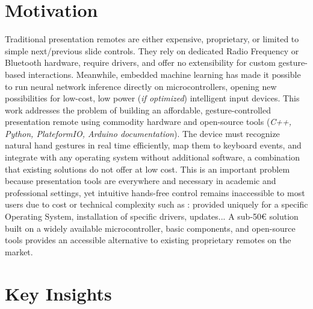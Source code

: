 \documentclass[sigconf,10pt,nonacm]{acmart}
\begin{document}
\section{Motivation}
\label{sec:motivation}

Traditional presentation remotes are either expensive, proprietary, or limited to simple next/previous slide controls. They rely on dedicated Radio Frequency or Bluetooth hardware, require drivers, and offer no extensibility for custom gesture-based interactions. Meanwhile, embedded machine learning has made it possible to run neural network inference directly on microcontrollers, opening new possibilities for low-cost, low power (\textit{if optimized}) intelligent input devices.
This work addresses the problem of building an affordable, gesture-controlled presentation remote using commodity hardware and open-source tools (\textit{C++, Python, PlateformIO, Arduino documentation}). The device must recognize natural hand gestures in real time efficiently, map them to keyboard events, and integrate with any operating system without additional software, a combination that existing solutions do not offer at low cost.
This is an important problem because presentation tools are everywhere and necessary in academic and professional settings, yet intuitive hands-free control remains inaccessible to most users due to cost or technical complexity such as : provided uniquely for a specific Operating System, installation of specific drivers, updates... A sub-50€ solution built on a widely available microcontroller, basic components, and open-source tools provides an accessible alternative to existing proprietary remotes on the market. 


%


\section{Key Insights}
\label{sec:key-insights}
\end{document}
